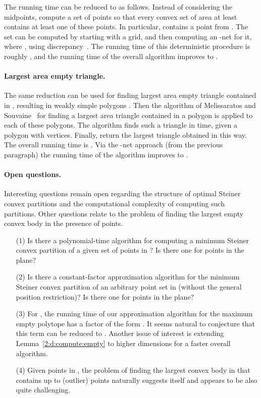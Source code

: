 \documentclass[11pt]{article}
\begin{document}
The running time can be reduced to  as follows.
Instead of considering the  midpoints, compute a set  of
 points so that every convex set of area at least
 contains at least one of these points. In particular, 
contains a point from . The set  can be computed by starting with
a  grid, and then computing an -net for it,
where , using discrepancy~\cite{Ma02}. The running
time of this deterministic procedure is roughly , and the
running time of the overall algorithm improves to
.


\paragraph{Largest area empty triangle.}
The same reduction can be used for finding largest area empty triangle
contained in , resulting in  weakly simple polygons .
Then the algorithm of Melissaratos and Souvaine~\cite{ms-sphsg-92} for
finding a largest area triangle contained in a polygon is applied to
each of these  polygons.
The algorithm finds such a triangle in  time, given a
polygon with  vertices. Finally, return the largest triangle
obtained in this way. The overall running time is . Via the
-net approach (from the previous paragraph) the running time of
the algorithm improves to .


\paragraph{Open questions.}
Interesting questions remain open regarding the structure of optimal
Steiner convex partitions and the computational complexity of
computing such partitions. Other questions relate to the problem of
finding the largest empty convex body in the presence of points.

\begin{itemize}

    \item [(1)] Is there a polynomial-time algorithm for computing a
    minimum Steiner convex partition of a given set of  points in
    ? Is there one for points in the plane?

    \item [(2)] Is there a constant-factor approximation algorithm for
    the minimum Steiner convex partition of an arbitrary point set in
     (without the general position restriction)? Is there one
    for points in the plane?

    \item [(3)] For , the running time of our approximation
    algorithm for the maximum empty polytope has a factor of the form
    .  It seems natural to conjecture that this term can
    be reduced to . Another issue of interest is extending
    Lemma~\ref{2:d:compute:empty} to higher dimensions for a faster
    overall algorithm.

    \item [(4)] Given  points in , the problem of finding
    the largest convex body in  that contains up to 
    (outlier) points naturally suggests itself and appears to be also
    quite challenging.

\end{itemize}
\end{document}
